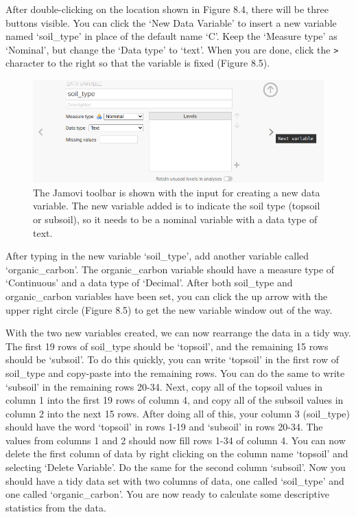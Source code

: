 \documentclass[
]{scrbook}
\begin{document}
After double-clicking on the location shown in Figure 8.4, there will be three buttons visible.
You can click the `New Data Variable' to insert a new variable named `soil\_type' in place of the default name `C'.
Keep the `Measure type' as `Nominal', but change the `Data type' to `text'.
When you are done, click the \texttt{\textgreater{}} character to the right so that the variable is fixed (Figure 8.5).

\begin{figure}
\includegraphics[width=1\linewidth]{img/jamovi_set_variable} \caption{The Jamovi toolbar is shown with the input for creating a new data variable. The new variable added is to indicate the soil type (topsoil or subsoil), so it needs to be a nominal variable with a data type of text.}\label{fig:unnamed-chunk-28}
\end{figure}

After typing in the new variable `soil\_type', add another variable called `organic\_carbon'.
The organic\_carbon variable should have a measure type of `Continuous' and a data type of `Decimal'.
After both soil\_type and organic\_carbon variables have been set, you can click the up arrow with the upper right circle (Figure 8.5) to get the new variable window out of the way.

With the two new variables created, we can now rearrange the data in a tidy way.
The first 19 rows of soil\_type should be `topsoil', and the remaining 15 rows should be `subsoil'.
To do this quickly, you can write `topsoil' in the first row of soil\_type and copy-paste into the remaining rows.
You can do the same to write `subsoil' in the remaining rows 20-34.
Next, copy all of the topsoil values in column 1 into the first 19 rows of column 4, and copy all of the subsoil values in column 2 into the next 15 rows.
After doing all of this, your column 3 (soil\_type) should have the word `topsoil' in rows 1-19 and `subsoil' in rows 20-34.
The values from columns 1 and 2 should now fill rows 1-34 of column 4.
You can now delete the first column of data by right clicking on the column name `topsoil' and selecting `Delete Variable'.
Do the same for the second column `subsoil'.
Now you should have a tidy data set with two columns of data, one called `soil\_type' and one called `organic\_carbon'.
You are now ready to calculate some descriptive statistics from the data.
\end{document}
